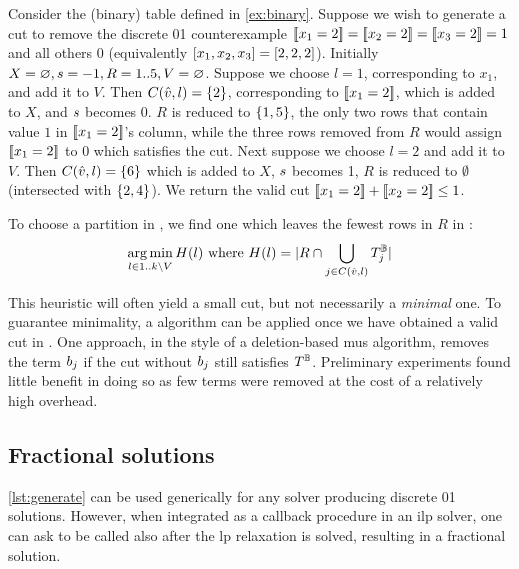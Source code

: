 \documentclass[a4paper,UKenglish,cleveref,autoref,thm-restate]{lipics-v2021}
\newcommand{\milp}{\gls{ilp}\xspace}
\newcommand{\relaxation}{\acrshort{lp} relaxation\xspace}
\begin{document}
\begin{example}
\label{ex:frac}
   Consider the (binary) table defined in \cref{ex:binary}.
Suppose we wish to generate a cut to 
remove the discrete 01 counterexample $[\![x_{1} = 2]\!] = [\![x_{2} = 2]\!] = [\![x_{3} = 2]\!] = 1$ and all others $0$ (equivalently $[x_1,x_2,x_3] = [2,2,2]$).
Initially $X = \varnothing, s = -1, R = 1..5, V = \varnothing$.
Suppose we choose $l = 1$, corresponding to $x_1$, and add it to $V$.
Then $C(\hat{v},l) = \{2\}$, corresponding to $[\![x_{1} = 2]\!]$, which is added to $X$, and $s$ becomes 0. 
$R$ is reduced to $\{1,5\}$, the only two rows that contain value $1$ in $[\![x_{1} = 2]\!]$'s column, while the three rows removed from $R$ would assign $[\![x_{1} = 2]\!]$ to $0$ which satisfies the cut.
Next suppose we choose $l = 2$ and add it to $V$.
Then $C(\hat{v},l) = \{6\}$ which is added to $X$, $s$ becomes 1,
$R$ is reduced to $\emptyset$ (intersected with 
$\{2,4\}$).
We return the valid cut
$[\![x_{1} = 2]\!] + [\![x_{2} = 2]\!] \leq 1$.
\end{example}

To choose a partition in , we find one which leaves the fewest rows in $R$ in :
\begin{equation}
\label{eq:greedy}
\operatorname*{arg\,min}_{l \in 1..k \setminus V} H(l)
\text{~where~}
H(l) = |R \cap \bigcup_{j \in C(\hat{v}, l)} T^{\mathbb{B}}_j|
\end{equation}

This heuristic will often yield a small cut, but not necessarily a \textit{minimal} one.
To guarantee minimality, a \lazyShrink algorithm can be applied once we have obtained a valid cut in .
One approach, in the style of a deletion-based \acrlong{mus} algorithm, removes the term $b_j$ if the cut without $b_j$ still satisfies $T^{\mathbb{B}}$.
Preliminary experiments found little benefit in doing so as few terms were removed at the cost of a relatively high overhead.

\subsection{Fractional solutions}
\label{sec:cuts:fractional}


\cref{lst:generate} can be used generically for any solver producing discrete 01 solutions.
However, when integrated as a callback procedure in an \milp solver, one can ask to be called also after the \relaxation is solved, resulting in a fractional solution.
\end{document}

